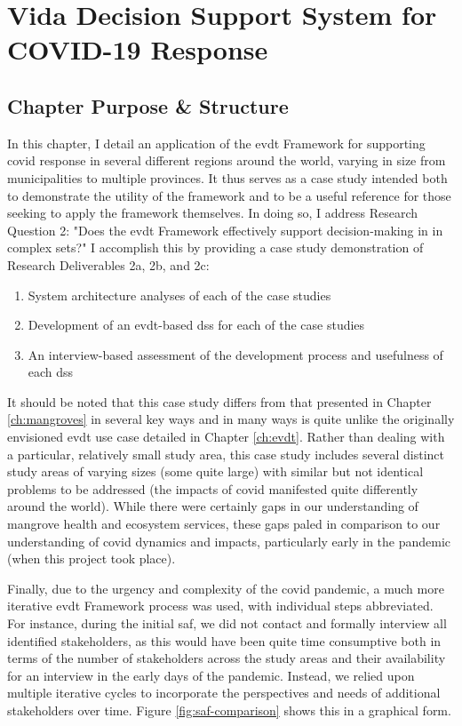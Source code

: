 \chapter{Vida Decision Support System for COVID-19 Response} \label{ch:vida}


\section{Chapter Purpose \& Structure} \label{sec:vida-purpose}

In this chapter, I detail an application of the \acf{evdt} Framework for supporting \acf{covid} response in several different regions around the world, varying in size from municipalities to multiple provinces. It thus serves as a case study intended both to demonstrate the utility of the framework and to be a useful reference for those seeking to apply the framework themselves. In doing so, I address Research Question 2: "Does the \ac{evdt} Framework effectively support decision-making in in complex \acf{sets}?" I accomplish this by providing a case study demonstration of Research Deliverables 2a, 2b, and 2c: 

\begin{enumerate}[label=\emph{\alph*},itemsep=0pt,parsep=0pt]
	\item{System architecture analyses of each of the case studies} 
	\item{Development of an \ac{evdt}-based \acf{dss} for each of the case studies} 
	\item{An interview-based assessment of the development process and usefulness of each \ac{dss}} 
\end{enumerate}

It should be noted that this case study differs from that presented in Chapter \ref{ch:mangroves} in several key ways and in many ways is quite unlike the originally envisioned \ac{evdt} use case detailed in Chapter \ref{ch:evdt}. Rather than dealing with a particular, relatively small study area, this case study includes several distinct study areas of varying sizes (some quite large) with similar but not identical problems to be addressed (the impacts of \ac{covid} manifested quite differently around the world). While there were certainly gaps in our understanding of mangrove health and ecosystem services, these gaps paled in comparison to our understanding of \ac{covid} dynamics and impacts, particularly early in the pandemic (when this project took place). 

Finally, due to the urgency and complexity of the \ac{covid} pandemic, a much more iterative \ac{evdt} Framework process was used, with individual steps abbreviated. For instance, during the initial \acf{saf}, we did not contact and formally interview all identified stakeholders, as this would have been quite time consumptive both in terms of the number of stakeholders across the study areas and their availability for an interview in the early days of the pandemic. Instead, we relied upon multiple iterative cycles to incorporate the perspectives and needs of additional stakeholders over time. Figure \ref{fig:saf-comparison} shows this in a graphical form.

